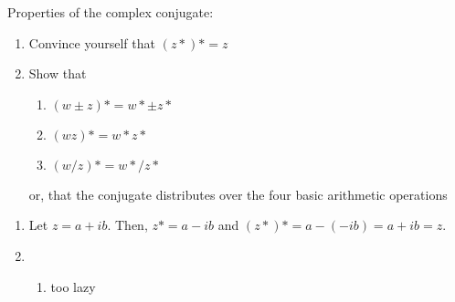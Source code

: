 \begin{exercise}
	Properties of the complex conjugate:
	\begin{enumerate}[label = (\alph*)]
		\item Convince yourself that \((z\ast)\ast=z\)
		\item Show that
			\begin{enumerate}[label = (\roman*)]
				\item \((w\pm z)\ast = w\ast \pm z\ast\)
				\item\label{e1:cjpm} \((wz)\ast = w\ast z\ast\)
				\item \((w/z)\ast = w\ast/z\ast\)
			\end{enumerate}
			or, that the conjugate distributes over the four basic arithmetic operations
	\end{enumerate}
\begin{solution}
	\begin{enumerate}[label = (\alph*)]
		\item Let \(z=a+ib\). Then, \(z\ast = a-ib\) and \((z\ast)\ast = a-(-ib) = a+ib = z\).
		\item \begin{enumerate}[label = (\roman*)]
			\item too lazy
		\end{enumerate}
	\end{enumerate}
\end{solution}
\end{exercise}

